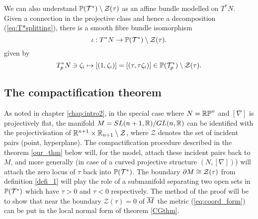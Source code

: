 \begin{rmk} We can also understand $\mathbb{P}(\mathcal{T}^*)\setminus \mathcal{Z}(\tau)$ as an affine bundle modelled on $T^* N$. Given a connection in the projective class and hence a decomposition (\ref{eq:T*splitting}), there is a smooth fibre bundle isomorphism
  \begin{equation}\label{key-id}
\iota : T^* N\to \mathbb{P}(\mathcal{T}^*)\setminus \mathcal{Z}(\tau).
    \end{equation}
%
given by
\begin{equation} \label{eq:T*N_is_M}
T_p^*N\ni \zeta_i  \mapsto [(1,\zeta_i)]=[(\tau,\tau \zeta_i)]\in
\mathbb{P}(\mathcal{T}_p^*)\setminus \mathcal{Z}(\tau) .
\end{equation}
\end{rmk}


\subsection{The compactification theorem}

As noted in chapter \ref{chap:intro2}, in the special case where $N=\mathbb{RP}^n$ and $[\nabla]$ is projectively flat, the manifold $M=SL(n+1, \mathbb{R})/GL(n, \mathbb{R})$ can be identified with the projectivisation of $\mathbb{R}^{n+1}\times \mathbb{R}_{n+1}\setminus {\mathcal Z}$, where ${\mathcal Z}$ denotes the set of incident pairs (point, hyperplane). The compactification procedure described in the theorem \ref{our_thm} below will, for the model, attach these incident pairs back to $M$, and more generally (in case of a curved projective structure $(N,[\nabla])$) will attach the zero locus of $\tau$ back into $\mathbb{P}(\mathcal{T}^*)$. The boundary $\partial M \cong \mathcal{Z}(\tau)$ from definition \ref{defi_1} will play the role of a submanifold
separating two open sets in $\mathbb{P}(\mathcal{T}^*)$ which have $\tau>0$ and $\tau<0$ respectively. The method of the proof will be to show that near
the boundary ${\mathcal{Z}}(\tau)=0$ of $\overline{M}$ the metric 
(\ref{eq:coord_form}) can be put in the local normal form of theorem 
\ref{CGthm}.


